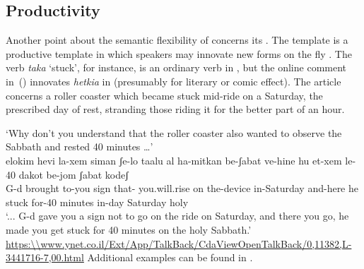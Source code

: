 \begin{exe}
\begin{xlist}
\begin{xlist}
\begin{exe}
\begin{exe}
\begin{xlist}
\begin{exe}
\begin{xlist}
\begin{exe}
\begin{xlist}
\begin{xlist}
\begin{exe}
\begin{xlist}
\begin{exe}
\begin{xlist}
\begin{exe}
\begin{exe}
\begin{exe}
\begin{xlist}
\begin{exe}
\begin{exe}
\begin{xlist}
\begin{xlist}
\begin{exe}
\begin{xlist}
\begin{exe}
\begin{exe}
\begin{exe}
\begin{xlist}
\begin{exe}
\begin{exe}
\begin{xlist}
\begin{exe}
\begin{xlist}
\begin{exe}
\begin{xlist}
\begin{exe}
\begin{xlist}
\begin{exe}
\begin{exe}
\begin{xlist}
\begin{exe}
\begin{exe}
\begin{xlist}
\begin{xlist}
\begin{exe}
\begin{xlist}
\begin{xlist}
\begin{exe}
\begin{xlist}
\begin{exe}
\begin{xlist}
\begin{exe}
\begin{xlist}
\begin{exe}
\begin{xlist}
\begin{exe}
\begin{exe}
\begin{exe}
\begin{exe}
\begin{xlist}
	\subsection{Productivity} \label{vd:caus:product}
Another point about the semantic flexibility of {\vd} concerns its . The template {\thif} is a productive  template in which speakers may innovate new forms on the fly \citep{lev16}. The verb \emph{taka} `stuck', for instance, is an ordinary  verb in {\tkal}, but the online comment in~(\nextx) innovates \emph{hetkia} in {\thif} (presumably for literary or comic effect). The article concerns a roller coaster which became stuck mid-ride on a Saturday, the prescribed day of rest, stranding those riding it for the better part of an hour.
 \begin{exe}
\ex  `Why don't you understand that the roller coaster also wanted to observe the Sabbath and rested 40 minutes {\dots}'  \\
	{  elokim hevi la-xem siman ʃe-lo taalu al ha-mitkan be-ʃabat ve-hine hu  et-xem le-40 dakot be-jom ʃabat kodeʃ\\
 	  {} G-d brought to-you sign that- you.will.rise on the-device in-Saturday and-here he stuck  for-40 minutes in-day Saturday holy\\
 	\glt `{...} G-d gave you a sign not to go on the ride on Saturday, and there you go, he made you get stuck for 40 minutes on the holy Sabbath.' \hfill \url{https:\\www.ynet.co.il/Ext/App/TalkBack/CdaViewOpenTalkBack/0,11382,L-3441716-7,00.html} } 		
 \z 
Additional examples can be found in \cite{lev16}.


\end{exe}
\end{xlist}
\end{exe}
\end{exe}
\end{exe}
\end{exe}
\end{xlist}
\end{exe}
\end{xlist}
\end{exe}
\end{xlist}
\end{exe}
\end{xlist}
\end{exe}
\end{xlist}
\end{xlist}
\end{exe}
\end{xlist}
\end{xlist}
\end{exe}
\end{exe}
\end{xlist}
\end{exe}
\end{exe}
\end{xlist}
\end{exe}
\end{xlist}
\end{exe}
\end{xlist}
\end{exe}
\end{xlist}
\end{exe}
\end{exe}
\end{xlist}
\end{exe}
\end{exe}
\end{exe}
\end{xlist}
\end{exe}
\end{xlist}
\end{xlist}
\end{exe}
\end{exe}
\end{xlist}
\end{exe}
\end{exe}
\end{exe}
\end{xlist}
\end{exe}
\end{xlist}
\end{exe}
\end{xlist}
\end{xlist}
\end{exe}
\end{xlist}
\end{exe}
\end{xlist}
\end{exe}
\end{exe}
\end{xlist}
\end{xlist}
\end{exe}
